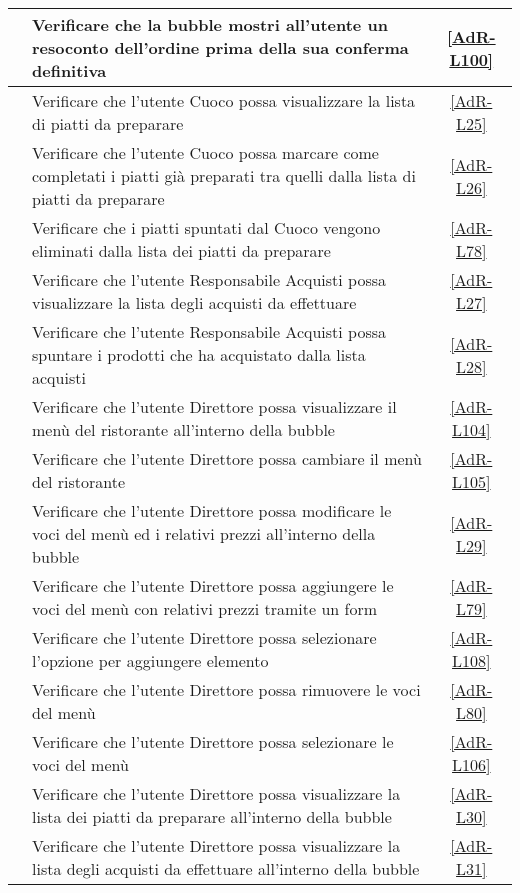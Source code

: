 \begin{longtable}{|c|P{9cm}|c|}
	\hline {} & Verificare che la bubble mostri all'utente un resoconto dell'ordine prima della sua conferma definitiva & \ref{AdR-L100} \\
	\hline {} & Verificare che l'utente Cuoco possa visualizzare la lista di piatti da preparare & \ref{AdR-L25} \\
	\hline {} & Verificare che l'utente Cuoco possa marcare come completati i piatti già preparati tra quelli dalla lista di piatti da preparare  & \ref{AdR-L26} \\
	\hline {} & Verificare che i piatti spuntati dal Cuoco vengono eliminati dalla lista dei piatti da preparare & \ref{AdR-L78} \\
	\hline {} & Verificare che l'utente Responsabile Acquisti possa visualizzare la lista degli acquisti da effettuare & \ref{AdR-L27} \\
	\hline {} & Verificare che l'utente Responsabile Acquisti possa spuntare i prodotti che ha acquistato dalla lista acquisti & \ref{AdR-L28} \\
	\hline {} & Verificare che l'utente Direttore possa visualizzare il menù del ristorante all’interno della bubble & \ref{AdR-L104}  \\
	\hline {} & Verificare che l'utente Direttore possa cambiare il menù del ristorante & \ref{AdR-L105} \\
	\hline {} & Verificare che l'utente Direttore possa modificare le voci del menù ed i relativi prezzi all’interno della bubble & \ref{AdR-L29} \\
	\hline {} & Verificare che l'utente Direttore possa aggiungere le voci del menù con relativi prezzi tramite un form & \ref{AdR-L79} \\
	\hline {} & Verificare che l'utente Direttore possa selezionare l'opzione per aggiungere elemento & \ref{AdR-L108} \\
	\hline {} & Verificare che l'utente Direttore possa rimuovere le voci del menù & \ref{AdR-L80} \\
	\hline {} & Verificare che l'utente Direttore possa selezionare le voci del menù & \ref{AdR-L106} \\
	\hline {} & Verificare che l'utente Direttore possa visualizzare la lista dei piatti da preparare all’interno della bubble & \ref{AdR-L30} \\
	\hline {} & Verificare che l'utente Direttore possa visualizzare la lista degli acquisti da effettuare all’interno della bubble & \ref{AdR-L31} \\

\end{longtable}
